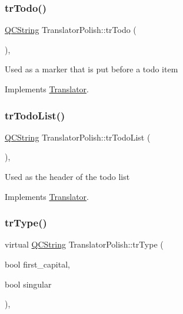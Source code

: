 \subsubsection{\texorpdfstring{trTodo()}{trTodo()}}
{\footnotesize\ttfamily \mbox{\hyperlink{class_q_c_string}{Q\+C\+String}} Translator\+Polish\+::tr\+Todo (\begin{DoxyParamCaption}{ }\end{DoxyParamCaption})\hspace{0.3cm}{\ttfamily [inline]}, {\ttfamily [virtual]}}

Used as a marker that is put before a todo item 

Implements \mbox{\hyperlink{class_translator}{Translator}}.

\mbox{\label{class_translator_polish_ab1de6749548a4afe26bff382fa459e1a}} 
\subsubsection{\texorpdfstring{trTodoList()}{trTodoList()}}
{\footnotesize\ttfamily \mbox{\hyperlink{class_q_c_string}{Q\+C\+String}} Translator\+Polish\+::tr\+Todo\+List (\begin{DoxyParamCaption}{ }\end{DoxyParamCaption})\hspace{0.3cm}{\ttfamily [inline]}, {\ttfamily [virtual]}}

Used as the header of the todo list 

Implements \mbox{\hyperlink{class_translator}{Translator}}.

\mbox{\label{class_translator_polish_aee607fc47263657a54f8b0bc5dc992a3}} 
\subsubsection{\texorpdfstring{trType()}{trType()}}
{\footnotesize\ttfamily virtual \mbox{\hyperlink{class_q_c_string}{Q\+C\+String}} Translator\+Polish\+::tr\+Type (\begin{DoxyParamCaption}\item[{bool}]{first\+\_\+capital,  }\item[{bool}]{singular }\end{DoxyParamCaption})\hspace{0.3cm}{\ttfamily [inline]}, {\ttfamily [virtual]}}

